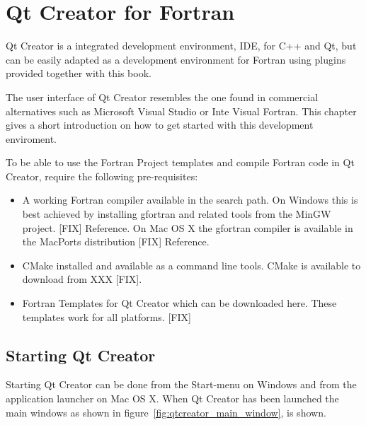 \chapter{Qt Creator for Fortran}

Qt Creator is a integrated development environment, IDE, for C++ and Qt, but can be easily adapted as a development environment for Fortran using plugins provided together with this book.

The user interface of Qt Creator resembles the one found in commercial alternatives such as Microsoft Visual Studio or Inte Visual Fortran. This chapter gives a short introduction on how to get started with this development enviroment.

To be able to use the Fortran Project templates and compile Fortran code in Qt Creator, require the following pre-requisites:

\begin{itemize}
\item A working Fortran compiler available in the search path. On Windows this is best achieved by installing gfortran and related tools from the MinGW project. [FIX] Reference. On Mac OS X the gfortran compiler is available in the MacPorts distribution [FIX] Reference.
\item CMake installed and available as a command line tools. CMake is available to download from XXX [FIX].
\item Fortran Templates for Qt Creator which can be downloaded here. These templates work for all platforms. [FIX]
\end{itemize}

\section{Starting Qt Creator}

Starting Qt Creator can be done from the Start-menu on Windows and from the application launcher on Mac OS X. When Qt Creator has been launched the main windows as shown in figure~\ref{fig:qtcreator_main_window}, is shown.


